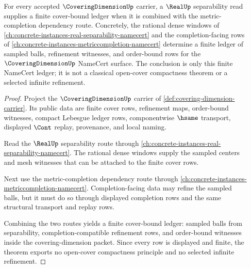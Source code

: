 \begin{theorem}
\label{thm:coveringdimension-real-separability-forward-bound}
For every accepted $\CoveringDimensionUp$ carrier, a $\RealUp$ separability read supplies a finite cover-bound ledger when it is combined with the metric-completion dependency route. Concretely, the rational dense windows of \autoref{ch:concrete-instances-real-separability-namecert} and the completion-facing rows of \autoref{ch:concrete-instances-metriccompletion-namecert} determine a finite ledger of sampled balls, refinement witnesses, and order-bound rows for the $\CoveringDimensionUp$ NameCert surface. The conclusion is only this finite NameCert ledger; it is not a classical open-cover compactness theorem or a selected infinite refinement.
\end{theorem}
\begin{proof}
Project the $\CoveringDimensionUp$ carrier of \autoref{def:covering-dimension-carrier}. Its public data are finite cover rows, refinement maps, order-bound witnesses, compact Lebesgue ledger rows, componentwise $\hsame$ transport, displayed $\Cont$ replay, provenance, and local naming.

Read the $\RealUp$ separability route through \autoref{ch:concrete-instances-real-separability-namecert}. The rational dense windows supply the sampled centers and mesh witnesses that can be attached to the finite cover rows.

Next use the metric-completion dependency route through \autoref{ch:concrete-instances-metriccompletion-namecert}. Completion-facing data may refine the sampled balls, but it must do so through displayed completion rows and the same structural transport and replay rows.

Combining the two routes yields a finite cover-bound ledger: sampled balls from separability, completion-compatible refinement rows, and order-bound witnesses inside the covering-dimension packet. Since every row is displayed and finite, the theorem exports no open-cover compactness principle and no selected infinite refinement.
\end{proof}

